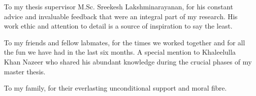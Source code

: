 \documentclass[linedtoc,
               parskip,
               twoside,
               longdoc,
               11pt,
               noheadingspace,
               accentcolor=tud1d,
               bigchapter,
               colorback]{tudreport}
\begin{document}
To my thesis supervisor M.Sc. Sreekesh Lakshminarayanan, for his constant advice and invaluable feedback that were an integral part of my research. His work ethic and attention to detail is a source of inspiration to say the least. 

To my friends and fellow labmates, for the times we worked together and for all the fun we have had in the last six months. A special mention to Khaleelulla Khan Nazeer who shared his abundant knowledge during the crucial phases of my master thesis. 

To my family, for their everlasting unconditional support and moral fibre.
\tableofcontents
\listoffigures
\listoftables
\cleardoublepage

\pagestyle{headings}















\begin{appendices}

\end{appendices}

\printglossary[type=acronym, title=Acronyms, toctitle=Acronyms]



\end{document}
